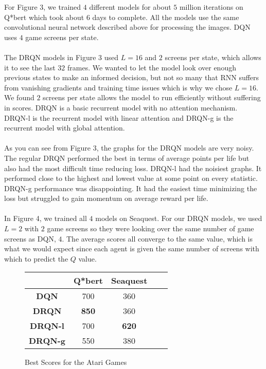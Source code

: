 \documentclass{article}
\begin{document}
For Figure 3, we trained $4$ different models for about $5$ million iterations on
Q*bert which took about $6$ days to complete. All the models use the same
convolutional neural network described above for processing the images. DQN uses
$4$ game screens per state. \\
\\
The DRQN models in Figure 3 used $L=16$ and $2$ screens per state, which allows it
to see the last $32$ frames. We wanted to let the model look over
enough previous states to make an informed decision, but not so many that RNN suffers
from vanishing gradients and training time issues which is why we
chose $L=16$. We found $2$ screens per state allows the model to run efficiently
without suffering in scores. DRQN is a basic recurrent model with no attention
mechanism. DRQN-l is the recurrent model with linear attention and DRQN-g is the
recurrent model with global attention. \\
\\
As you can see from Figure 3, the graphs for the DRQN models are very noisy. The
regular DRQN performed the best in terms of average points per life but also had
the most difficult time reducing loss. DRQN-l had the noisiest graphs. It
performed close to the highest and lowest value at some point on every statistic.
DRQN-g performance was disappointing. It had the easiest time minimizing the loss
but struggled to gain momentum on average reward per life. \\
\\
In Figure 4, we trained all $4$ models on Seaquest. For our DRQN models, we used
$L=2$ with $2$ game screens so they were looking over the same number of game
screens as DQN, $4$. The average scores all converge to the same value, which is
what we would expect since each agent is given the same number of screens
with which to predict the $Q$ value.\\

\begin{figure}[h]
    \begin{center}
        \begin{tabular}{| c | c | c | c | c |}
            \hline
            & \textbf{Q*bert} & \textbf{Seaquest}  \\ \hline
            \textbf{DQN} & 700 & 360  \\ \hline 
            \textbf{DRQN} & \textbf{850} & 360 \\ \hline
            \textbf{DRQN-l} & 700 & \textbf{620} \\ \hline
            \textbf{DRQN-g} & 550 & 380 \\ \hline
        \end{tabular}
    \end{center}
    \caption{Best Scores for the Atari Games}
\end{figure}
\end{document}
